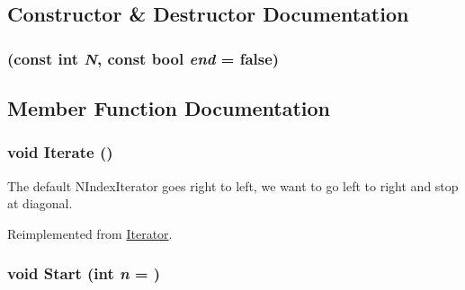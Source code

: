 \subsection{Constructor \& Destructor Documentation}
\hypertarget{classJKBuilder_1_1SymmMatItr_a5b2e8dde1f98a28e0e22b9fc4e911376}{
\subsubsection[{SymmMatItr}]{ (const int {\em N}, \/  const bool {\em end} = {\ttfamily false})}}
\label{classJKBuilder_1_1SymmMatItr_a5b2e8dde1f98a28e0e22b9fc4e911376}


\subsection{Member Function Documentation}
\hypertarget{classJKBuilder_1_1SymmMatItr_a7874a07e98b52f4f147cde6f39353bae}{
\subsubsection[{Iterate}]{\setlength{\rightskip}{0pt plus 5cm}void Iterate ()}}
\label{classJKBuilder_1_1SymmMatItr_a7874a07e98b52f4f147cde6f39353bae}


The default NIndexIterator goes right to left, we want to go left to right and stop at diagonal. 

Reimplemented from \hyperlink{classJKBuilder_1_1Iterator_a7874a07e98b52f4f147cde6f39353bae}{Iterator}.\hypertarget{classJKBuilder_1_1Iterator_a34ca36a99b20ae3170babadaffe51ed2}{
\subsubsection[{Start}]{\setlength{\rightskip}{0pt plus 5cm}void Start (int {\em n} = {})}}
\label{classJKBuilder_1_1Iterator_a34ca36a99b20ae3170babadaffe51ed2}


